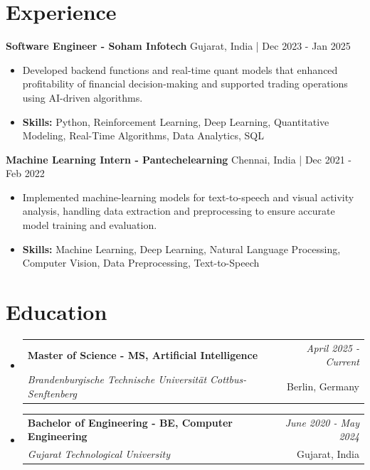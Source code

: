 \documentclass[a4paper,11pt]{article}
\makeatletter
\newcommand{\resumeSubheading}[4]{
\vspace{0.5mm}\item
    \begin{tabular*}{\linewidth}[t]{l@{\extracolsep{\fill}}r}
        \textbf{#1} & \textit{\footnotesize{#4}} \\
        \textit{\footnotesize{#3}} &  \footnotesize{#2}\\
    \end{tabular*}
    \vspace{-2.4mm}
}
\makeatother
\begin{document}
\section{\textbf{Experience}}


\vspace{1mm}
  \textbf{Software Engineer - Soham Infotech} \hfill Gujarat, India | Dec 2023 - Jan 2025
\vspace{-1.5mm} %
\begin{itemize}
  \item Developed backend functions and real-time quant models that enhanced profitability of financial decision-making and supported trading operations using AI-driven algorithms.

\vspace{-2mm}
  \item \textbf{Skills:} Python, Reinforcement Learning, Deep Learning, Quantitative Modeling, Real-Time Algorithms, Data Analytics, SQL
\end{itemize}

\vspace{1mm}
  \textbf{Machine Learning Intern - Pantechelearning} \hfill Chennai, India | Dec 2021 - Feb 2022
\vspace{-1.5mm} %
\begin{itemize}
  \item Implemented machine-learning models for text-to-speech and visual activity analysis, handling data extraction and preprocessing to ensure accurate model training and evaluation.
\vspace{-2mm}
  \item \textbf{Skills:} Machine Learning, Deep Learning, Natural Language Processing, Computer Vision, Data Preprocessing, Text-to-Speech
\end{itemize}\section{\textbf{Education}}
\vspace{-0.4mm}

\begin{itemize}[leftmargin=0.15in, label={}]
\resumeSubheading
{Master of Science - MS, Artificial Intelligence }{Berlin, Germany}
{Brandenburgische Technische Universität Cottbus-Senftenberg  }{April 2025 - Current}

\vspace{1.0mm} %
\resumeSubheading
{Bachelor of Engineering - BE, Computer Engineering  }{Gujarat, India}
{Gujarat Technological University }{June 2020 - May 2024}

\end{itemize}
\end{document}
